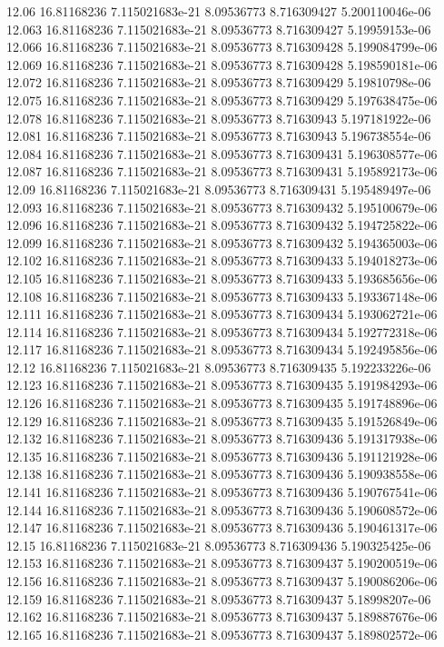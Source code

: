 {12.06 16.81168236 7.115021683e-21 8.09536773 8.716309427 5.200110046e-06
12.063 16.81168236 7.115021683e-21 8.09536773 8.716309427 5.19959153e-06
12.066 16.81168236 7.115021683e-21 8.09536773 8.716309428 5.199084799e-06
12.069 16.81168236 7.115021683e-21 8.09536773 8.716309428 5.198590181e-06
12.072 16.81168236 7.115021683e-21 8.09536773 8.716309429 5.19810798e-06
12.075 16.81168236 7.115021683e-21 8.09536773 8.716309429 5.197638475e-06
12.078 16.81168236 7.115021683e-21 8.09536773 8.71630943 5.197181922e-06
12.081 16.81168236 7.115021683e-21 8.09536773 8.71630943 5.196738554e-06
12.084 16.81168236 7.115021683e-21 8.09536773 8.716309431 5.196308577e-06
12.087 16.81168236 7.115021683e-21 8.09536773 8.716309431 5.195892173e-06
12.09 16.81168236 7.115021683e-21 8.09536773 8.716309431 5.195489497e-06
12.093 16.81168236 7.115021683e-21 8.09536773 8.716309432 5.195100679e-06
12.096 16.81168236 7.115021683e-21 8.09536773 8.716309432 5.194725822e-06
12.099 16.81168236 7.115021683e-21 8.09536773 8.716309432 5.194365003e-06
12.102 16.81168236 7.115021683e-21 8.09536773 8.716309433 5.194018273e-06
12.105 16.81168236 7.115021683e-21 8.09536773 8.716309433 5.193685656e-06
12.108 16.81168236 7.115021683e-21 8.09536773 8.716309433 5.193367148e-06
12.111 16.81168236 7.115021683e-21 8.09536773 8.716309434 5.193062721e-06
12.114 16.81168236 7.115021683e-21 8.09536773 8.716309434 5.192772318e-06
12.117 16.81168236 7.115021683e-21 8.09536773 8.716309434 5.192495856e-06
12.12 16.81168236 7.115021683e-21 8.09536773 8.716309435 5.192233226e-06
12.123 16.81168236 7.115021683e-21 8.09536773 8.716309435 5.191984293e-06
12.126 16.81168236 7.115021683e-21 8.09536773 8.716309435 5.191748896e-06
12.129 16.81168236 7.115021683e-21 8.09536773 8.716309435 5.191526849e-06
12.132 16.81168236 7.115021683e-21 8.09536773 8.716309436 5.191317938e-06
12.135 16.81168236 7.115021683e-21 8.09536773 8.716309436 5.191121928e-06
12.138 16.81168236 7.115021683e-21 8.09536773 8.716309436 5.190938558e-06
12.141 16.81168236 7.115021683e-21 8.09536773 8.716309436 5.190767541e-06
12.144 16.81168236 7.115021683e-21 8.09536773 8.716309436 5.190608572e-06
12.147 16.81168236 7.115021683e-21 8.09536773 8.716309436 5.190461317e-06
12.15 16.81168236 7.115021683e-21 8.09536773 8.716309436 5.190325425e-06
12.153 16.81168236 7.115021683e-21 8.09536773 8.716309437 5.190200519e-06
12.156 16.81168236 7.115021683e-21 8.09536773 8.716309437 5.190086206e-06
12.159 16.81168236 7.115021683e-21 8.09536773 8.716309437 5.18998207e-06
12.162 16.81168236 7.115021683e-21 8.09536773 8.716309437 5.189887676e-06
12.165 16.81168236 7.115021683e-21 8.09536773 8.716309437 5.189802572e-06
}
